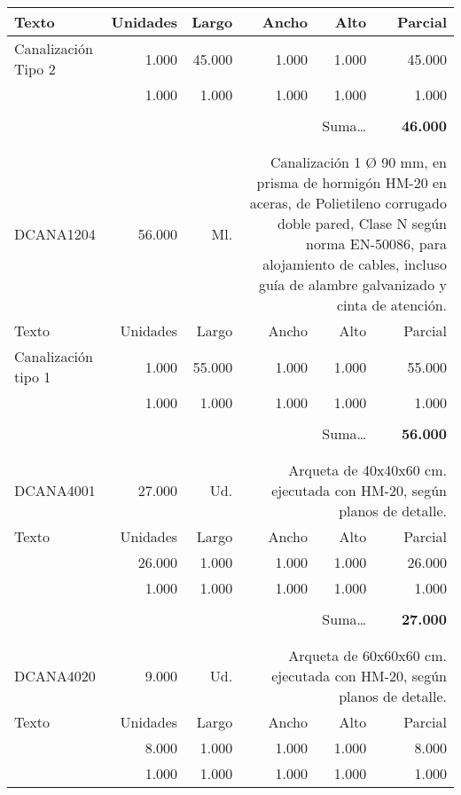 \documentclass{book}%
\begin{document}
\begin{longtable}{lrrrrr}
Texto&Unidades&Largo&Ancho&Alto&Parcial\\%
\hline%
\multicolumn{1}{p{3.5cm}}{Canalización Tipo 2}&1.000&45.000&1.000&1.000&45.000\\%
\multicolumn{1}{p{3.5cm}}{}&1.000&1.000&1.000&1.000&1.000\\%
&&&&&\\%
\multicolumn{5}{r}{Suma\ldots}&\textbf{46.000}\\%
\hline%
&&&&&\\%
&&&&&\\%
DCANA1204&56.000& Ml.&\multicolumn{3}{p{6cm}}{\scriptsize Canalización 1 Ø 90 mm, en prisma de hormigón HM-20 en aceras, de Polietileno corrugado doble pared, Clase N según norma EN-50086, para alojamiento de cables, incluso guía de alambre galvanizado y cinta de atención.\normalsize}\\%
Texto&Unidades&Largo&Ancho&Alto&Parcial\\%
\hline%
\multicolumn{1}{p{3.5cm}}{Canalización tipo 1}&1.000&55.000&1.000&1.000&55.000\\%
\multicolumn{1}{p{3.5cm}}{}&1.000&1.000&1.000&1.000&1.000\\%
&&&&&\\%
\multicolumn{5}{r}{Suma\ldots}&\textbf{56.000}\\%
\hline%
&&&&&\\%
&&&&&\\%
DCANA4001&27.000& Ud.&\multicolumn{3}{p{6cm}}{\scriptsize Arqueta de 40x40x60 cm. ejecutada con HM-20, según planos de detalle.\normalsize}\\%
Texto&Unidades&Largo&Ancho&Alto&Parcial\\%
\hline%
\multicolumn{1}{p{3.5cm}}{}&26.000&1.000&1.000&1.000&26.000\\%
\multicolumn{1}{p{3.5cm}}{}&1.000&1.000&1.000&1.000&1.000\\%
&&&&&\\%
\multicolumn{5}{r}{Suma\ldots}&\textbf{27.000}\\%
\hline%
&&&&&\\%
&&&&&\\%
DCANA4020&9.000& Ud.&\multicolumn{3}{p{6cm}}{\scriptsize Arqueta de 60x60x60 cm. ejecutada con HM-20, según planos de detalle.\normalsize}\\%
Texto&Unidades&Largo&Ancho&Alto&Parcial\\%
\hline%
\multicolumn{1}{p{3.5cm}}{}&8.000&1.000&1.000&1.000&8.000\\%
\multicolumn{1}{p{3.5cm}}{}&1.000&1.000&1.000&1.000&1.000\\%

\end{longtable}
\end{document}
